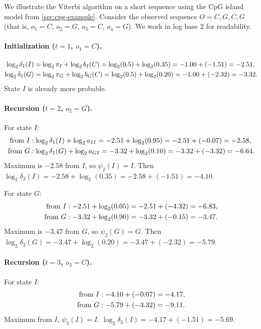 We illustrate the Viterbi algorithm on a short sequence using the CpG island model from \cref{sec:cpg-example}.
Consider the observed sequence $O = C, G, C, G$ (that is, $o_1 = C$, $o_2 = G$, $o_3 = C$, $o_4 = G$).
We work in log base 2 for readability.

\paragraph{Initialization ($t = 1$, $o_1 = C$).}
\begin{align}
  \log_2 \delta_1(I) &= \log_2 \pi_I + \log_2 b_I(C) = \log_2(0.5) + \log_2(0.35) = -1.00 + (-1.51) = -2.51, \notag \\
  \log_2 \delta_1(G) &= \log_2 \pi_G + \log_2 b_G(C) = \log_2(0.5) + \log_2(0.20) = -1.00 + (-2.32) = -3.32. \notag
\end{align}
State $I$ is already more probable.

\paragraph{Recursion ($t = 2$, $o_2 = G$).}
For state $I$:
\begin{align}
  \text{from } I&: \log_2 \delta_1(I) + \log_2 a_{II} = -2.51 + \log_2(0.95) = -2.51 + (-0.07) = -2.58, \notag \\
  \text{from } G&: \log_2 \delta_1(G) + \log_2 a_{GI} = -3.32 + \log_2(0.10) = -3.32 + (-3.32) = -6.64. \notag
\end{align}
Maximum is $-2.58$ from $I$, so $\psi_2(I) = I$.
Then $\log_2 \delta_2(I) = -2.58 + \log_2(0.35) = -2.58 + (-1.51) = -4.10$.

For state $G$:
\begin{align}
  \text{from } I&: -2.51 + \log_2(0.05) = -2.51 + (-4.32) = -6.83, \notag \\
  \text{from } G&: -3.32 + \log_2(0.90) = -3.32 + (-0.15) = -3.47. \notag
\end{align}
Maximum is $-3.47$ from $G$, so $\psi_2(G) = G$.
Then $\log_2 \delta_2(G) = -3.47 + \log_2(0.20) = -3.47 + (-2.32) = -5.79$.

\paragraph{Recursion ($t = 3$, $o_3 = C$).}
For state $I$:
\begin{align}
  \text{from } I&: -4.10 + (-0.07) = -4.17, \notag \\
  \text{from } G&: -5.79 + (-3.32) = -9.11. \notag
\end{align}
Maximum from $I$, $\psi_3(I) = I$.
$\log_2 \delta_3(I) = -4.17 + (-1.51) = -5.69$.


